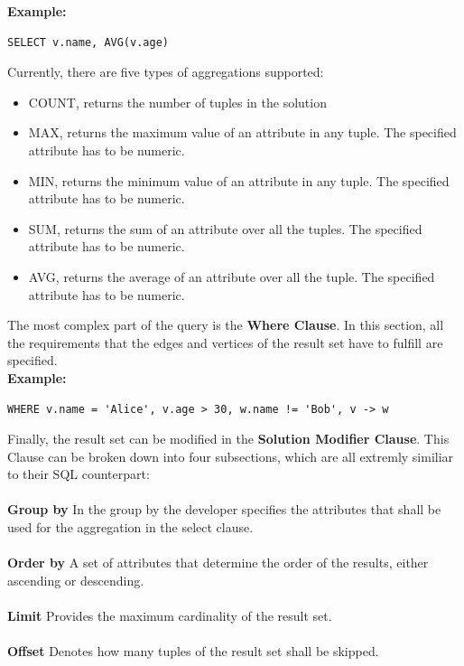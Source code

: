 \documentclass[11pt,singlecolumn]{scrartcl}
\begin{document}
\textbf{Example:}
\begin{verbatim}
SELECT v.name, AVG(v.age)
 \end{verbatim} 
 Currently, there are five types of aggregations supported:\\
 \begin{itemize} 
\item COUNT, returns the number of tuples in the solution 
\item MAX, returns the maximum value of an attribute in any tuple. The specified attribute has to be numeric.
\item MIN, returns the minimum value of an attribute in any tuple. The specified attribute has to be numeric.
\item SUM, returns the sum of an attribute over all the tuples. The specified attribute has to be numeric.
\item AVG, returns the average of an attribute over all the tuple. The specified attribute has to be numeric.
\end{itemize}

The most complex part of the query is the \textbf{Where Clause}. In this section, all the requirements that the edges and vertices of the result set have to fulfill are specified.\\
\textbf{Example:}
\begin{verbatim}
WHERE v.name = 'Alice', v.age > 30, w.name != 'Bob', v -> w
\end{verbatim}

Finally, the result set can be modified in the \textbf{Solution Modifier Clause}. This Clause can be broken down into four subsections, which are all extremly similiar to their SQL counterpart:\\\\
\textbf{Group by} \quad In the group by the developer specifies the attributes that shall be used for the aggregation in the select clause.\\\\
\textbf{Order by} \quad A set of attributes that determine the order of the results, either ascending or descending.\\\\
\textbf{Limit} \quad Provides the maximum cardinality of the result set.\\\\
\textbf{Offset} \quad Denotes how many tuples of the result set shall be skipped.\\\\
\end{document}
